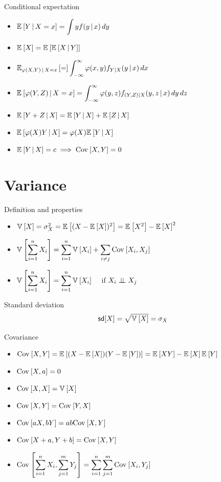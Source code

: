\documentclass[landscape]{article}
\newenvironment{titemize}[1]{
  \begin{minipage}[h]{\columnwidth}
    #1
    \begin{itemize}
}{
    \end{itemize}
  \end{minipage}
}
\begin{document}
\begin{multicols*}{2}
\begin{titemize}{Conditional expectation}
  \item $\E{Y\giv X=x} = \displaystyle\int y f(y\giv x)\dy$
  \item $\E{X} = \E{\E{X\giv Y}}$
  \item $\E[\transform(X,Y)\giv X=x]
    = \displaystyle\int_{-\infty}^\infty \transform(x,y)f_{Y|X}(y\giv x)\dx$
  \item $\E{\transform(Y,Z)\giv X=x} =
    \displaystyle\int_{-\infty}^\infty\transform(y,z)
    f_{(Y,Z)|X}(y,z\giv x)\,dy\,dz$
  \item $\E{Y+Z\giv X} = \E{Y\giv X} + \E{Z\giv X}$
  \item $\E{\transform(X)Y\giv X} = \transform(X)\E{Y\giv X}$
  \item $\E{Y\giv X} = c \imp \cov{X,Y}=0$
\end{titemize}

\section{Variance}

\begin{titemize}{Definition and properties}
  \item $\V{X} = \sigma_X^2 = \E{(X-\E{X})^2} = \E{X^2} - \E{X}^2$
  \item $\V{\displaystyle\sum_{i=1}^n X_i} =
    \displaystyle\sum_{i=1}^n \V{X_i} + \sum_{i\ne j}\cov{X_i,X_j}$
  \item $\V{\displaystyle\sum_{i=1}^n X_i} =
    \displaystyle\sum_{i=1}^n\V{X_i} \quad$ if $X_i \ind X_j$
\end{titemize}

Standard deviation
\[\sd[X] = \sqrt{\V{X}} = \sigma_X\]

Covariance
\begin{itemize}
  \item $\cov{X,Y} = \E{(X-\E{X})(Y-\E{Y})} = \E{XY}-\E{X}\E{Y}$
  \item $\cov{X,a} = 0$
  \item $\cov{X,X} = \V{X}$
  \item $\cov{X,Y} = \cov{Y,X}$
  \item $\cov{aX,bY} = ab\cov{X,Y}$
  \item $\cov{X+a,Y+b} = \cov{X,Y}$
  \item $\cov{\displaystyle\sumin X_i, \sumjm Y_j}
    = \displaystyle\sumin\sumjm\cov{X_i, Y_j}$
\end{itemize}


\end{multicols*}
\end{document}
